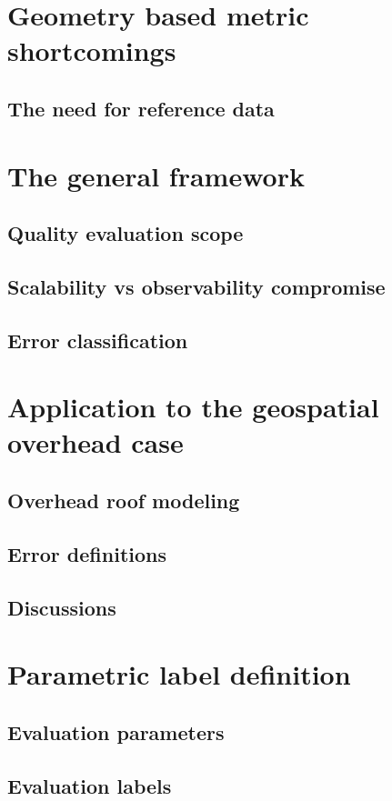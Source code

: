 \minitoc
\section{Geometry based metric shortcomings}
    \subsection{The need for reference data}
   
\section{The general framework}
    \subsection{Quality evaluation scope}
    \subsection{Scalability vs observability compromise}
    \subsection{Error classification}
\section{Application to the geospatial overhead case}
    \subsection{Overhead roof modeling}
    \subsection{Error definitions}
    \subsection{Discussions}
\section{Parametric label definition}
    \subsection{Evaluation parameters}
    \subsection{Evaluation labels}
